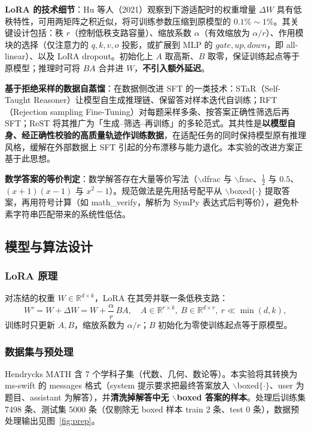 \textbf{LoRA 的技术细节}：Hu 等人（2021）观察到下游适配时的权重增量 $\Delta W$ 具有低秩特性，可用两矩阵之积近似，将可训练参数压缩到原模型的 $0.1\%\sim1\%$。其关键设计包括：秩 $r$（控制低秩支路容量）、缩放系数 $\alpha$（有效缩放为 $\alpha/r$）、作用模块的选择（仅注意力的 $q,k,v,o$ 投影，或扩展到 MLP 的 $gate,up,down$，即 all-linear）、以及 LoRA dropout。初始化上 $A$ 取高斯、$B$ 取零，保证训练起点等于原模型；推理时可将 $BA$ 合并进 $W$，\textbf{不引入额外延迟}。

\textbf{基于拒绝采样的数据自蒸馏}：在数据侧改进 SFT 的一类技术：STaR（Self-Taught Reasoner）让模型自生成推理链、保留答对样本迭代自训练；RFT（Rejection sampling Fine-Tuning）对每题采样多条、按答案正确性筛选后再 SFT；ReST 将其推广为「生成–筛选–再训练」的多轮范式。其共性是\textbf{以模型自身、经正确性校验的高质量轨迹作训练数据}，在适配任务的同时保持模型原有推理风格，缓解在外部数据上 SFT 引起的分布漂移与能力退化。本实验的改进方案正基于此思想。

\textbf{数学答案的等价判定}：数学解答存在大量等价写法（$\backslash$dfrac 与 $\backslash$frac、$\frac{1}{2}$ 与 $0.5$、$(x{+}1)(x{-}1)$ 与 $x^2{-}1$）。规范做法是先用括号配平从 $\backslash$boxed$\{\cdot\}$ 提取答案，再用符号计算（如 math\_verify，解析为 SymPy 表达式后判等价），避免朴素字符串匹配带来的系统性低估。



\subsection{模型与算法设计}

\subsubsection{LoRA 原理} 对冻结的权重 $W\in\mathbb{R}^{d\times k}$，LoRA 在其旁并联一条低秩支路：
\[
W' = W + \Delta W = W + \frac{\alpha}{r}\, B A,\quad A\in\mathbb{R}^{r\times k},\ B\in\mathbb{R}^{d\times r},\ r\ll \min(d,k),
\]
训练时只更新 $A,B$，缩放系数为 $\alpha/r$；$B$ 初始化为零使训练起点等于原模型。

\subsubsection{数据集与预处理} Hendrycks MATH 含 7 个学科子集（代数、几何、数论等）。本实验将其转换为 ms-swift 的 messages 格式（system 提示要求把最终答案放入 $\backslash$boxed$\{\cdot\}$、user 为题目、assistant 为解答），并\textbf{清洗掉解答中无 $\backslash$boxed 答案的样本}。处理后训练集 7498 条、测试集 5000 条（仅剔除无 boxed 样本 train 2 条、test 0 条），数据预处理输出见图~\ref{fig:prep}。

